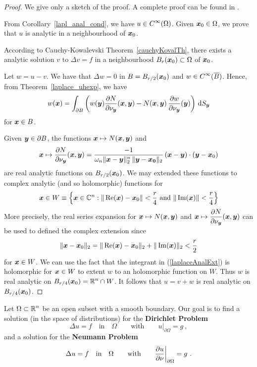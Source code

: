 \begin{proof}
We give only a sketch of the proof.  A complete proof can be found in
\cite{FoPDE,Tr}.

From Corollary~\ref{lapl_anal_cond}, we have
$\displaystyle u \in C^{\infty}(\Omega)$.
Given ${\bm{x}}_0\in \Omega$, we prove that $u$ is analytic in a
neighbourhood of ${\bm{x}}_0$.

According to Cauchy-Kowalevski Theorem~\ref{cauchyKovalTh}, there
exists a analytic solution $v$ to $\Delta v = f$ in a neighbourhood
$B_r({\bm{x}}_0) \subset \Omega$ of ${\bm{x}}_0$.

Let $w = u-v$.  We have that $\Delta w =0$ in $B = B_{r/2}({\bm{x}}_0)$
and $\displaystyle w \in C^{\infty}(\overline{B})$.  Hence, from
Theorem~\ref{laplace_uhexp}, we have
\begin{equation} \label{laplaceAnalExt}
w({\bm{x}}) = \int_{\partial B} \left( w({\bm{y}})
\frac{\partial{N}}{\partial \nu_{{\bm{y}}}}({\bm{x}},{\bm{y}}) -
N({\bm{x}},{\bm{y}})\,\frac{\partial{w}}{\partial \nu_{{\bm{y}}}}({\bm{y}})\right)
\,\mathrm{d}{S}_{{\bm{y}}}
\end{equation}
for ${\bm{x}} \in B$.

Given ${\bm{y}} \in \partial B$, the functions
${\bm{x}} \mapsto N({\bm{x}},{\bm{y}})$ and
\[
{\bm{x}} \mapsto \frac{\partial{N}}{\partial \nu_{{\bm{y}}}}({\bm{x}},{\bm{y}})
= \frac{-1}{\omega_n \|{\bm{x}}-{\bm{y}}\|_2^n\,\|{\bm{y}}-{\bm{x_0}}\|_2} \, 
({\bm{x}} - {\bm{y}}) \cdot ({\bm{y}}-{\bm{x}}_0) 
\]
are real analytic functions on $B_{r/2}({\bm{x}}_0)$.  We may extended these
functions to complex analytic (and so holomorphic) functions for
\[
{\bm{x}} \in W \equiv \left\{ {\bm{x}} \in \mathbb{C}^n :
\|\operatorname{Re}({\bm{x}}) - {\bm{x}}_0\| < \frac{r}{4}
\ \text{and} \ \|\operatorname{Im}({\bm{x}})\| < \frac{r}{4} \right\}
\]
More precisely, the real series expansion for 
${\bm{x}} \mapsto N({\bm{x}},{\bm{y}})$ and
$\displaystyle {\bm{x}} \mapsto
\frac{\partial{N}}{\partial \nu_{{\bm{y}}}}({\bm{x}},{\bm{y}})$ can be used to
defined the complex extension since
\[
\| {\bm{x}} -{\bm{x}}_0 \|_2
= \|\operatorname{Re}({\bm{x}}) - {\bm{x}}_0\|_2 + \|\operatorname{Im}({\bm{x}})\|_2 < \frac{r}{2}
\]
for ${\bm{x}} \in W$.
We can use the fact that the integrant in (\ref{laplaceAnalExt}) is
holomorphic for ${\bm{x}} \in W$ to extent $w$ to an holomorphic
function on $W$.  Thus $w$ is real analytic on
$\displaystyle B_{r/4}({\bm{x}}_0) = \mathbb{R}^n \cap W$.  It
follows that $u = v+w$ is real analytic on $B_{r/4}({\bm{x}}_0)$.
\end{proof}

Let $\displaystyle \Omega \subset \mathbb{R}^n$ be an open subset with a
smooth boundary.
Our goal is to find a solution (in the space of distributions) for the
{\bfseries Dirichlet Problem}
\begin{equation} \label{laplace_diri_probl}
\Delta u = f \quad \text{in} \quad \Omega \qquad \text{with}
\qquad u\big|_{\partial \Omega} = g \ ,
\end{equation}
and a solution for the
{\bfseries Neumann Problem}
\begin{equation} \label{laplace_neum_probl}
\Delta u = f \quad \text{in} \quad \Omega \qquad \text{with} \qquad
\frac{\partial{u}}{\partial \nu}\bigg|_{\partial \Omega} = g \ .
\end{equation}

